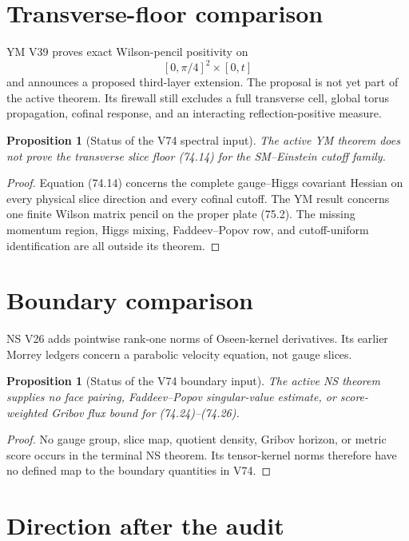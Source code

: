 \documentclass[11pt]{article}
\newtheorem{proposition}[theorem]{Proposition}
\theoremstyle{remark}
\begin{document}
\section{Transverse-floor comparison}

YM V39 proves exact Wilson-pencil positivity on
\[
 [0,\pi/4]^2\times[0,t]                               \tag{75.2}
\]
and announces a proposed third-layer extension.  The proposal is
not yet part of the active theorem.  Its firewall still excludes a
full transverse cell, global torus propagation, cofinal response,
and an interacting reflection-positive measure.

\begin{proposition}[Status of the V74 spectral input]
\label{prop:v15v75-ym}
The active YM theorem does not prove the transverse slice floor
(74.14) for the SM--Einstein cutoff family.
\end{proposition}

\begin{proof}
Equation (74.14) concerns the complete gauge--Higgs covariant
Hessian on every physical slice direction and every cofinal
cutoff.  The YM result concerns one finite Wilson matrix pencil on
the proper plate (75.2).  The missing momentum region, Higgs
mixing, Faddeev--Popov row, and cutoff-uniform identification are
all outside its theorem.
\end{proof}

\section{Boundary comparison}

NS V26 adds pointwise rank-one norms of Oseen-kernel derivatives.
Its earlier Morrey ledgers concern a parabolic velocity equation,
not gauge slices.

\begin{proposition}[Status of the V74 boundary input]
\label{prop:v15v75-ns}
The active NS theorem supplies no face pairing, Faddeev--Popov
singular-value estimate, or score-weighted Gribov flux bound for
(74.24)--(74.26).
\end{proposition}

\begin{proof}
No gauge group, slice map, quotient density, Gribov horizon, or
metric score occurs in the terminal NS theorem.  Its tensor-kernel
norms therefore have no defined map to the boundary quantities in
V74.
\end{proof}

\section{Direction after the audit}
\end{document}
